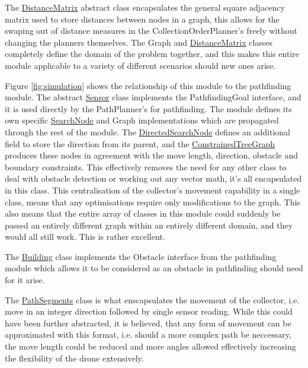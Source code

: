 \documentclass[10pt,a4paper]{article}
\begin{document}
The \hyperref[tab:DistanceMatrix]{\color{blue}DistanceMatrix} abstract class encapsulates the general square adjacency matrix used to store distances between nodes in a graph, this allows for the swaping out of distance measures in the CollectionOrderPlanner's freely without changing the planners themselves.
The Graph and \hyperref[tab:DistanceMatrix]{\color{blue}DistanceMatrix} classes completely define the domain of the problem together, and this makes this entire module applicable to a variety of different scenarios should new ones arise.

Figure \ref{fig:simulation} shows the relationship of this module to the pathfinding module. The abstract \hyperref[tab:Sensor]{\color{blue}Sensor} class implements the PathfindingGoal interface, and it is used directly by the PathPlanner's for pathfinding.
The module defines its own specific \hyperref[tab:SearchNode]{\color{blue}SearchNode} and Graph implementations which are propagated through the rest of the module.
The \hyperref[tab:DirectedSearchNode]{\color{blue}DirectedSearchNode} defines an additional field to store the direction from its parent, and the \hyperref[tab:ConstrainedTreeGraph]{\color{blue}ConstrainedTreeGraph} produces these nodes in agreement with the move length, direction, obstacle and boundary constraints. This effectively removes the need for any other class 
to deal with obstacle detection or working out any vector math, it's all encapsulated in this class. This centralisation of the collector's movement capability in a single class, means that 
any optimisations require only modifications to the graph. This also means that the entire array of classes in this module could suddenly be passed an entirely different graph within an entirely different domain,
and they would all still work. This is rather excellent.

The \hyperref[tab:Building]{\color{blue}Building} class implements the Obstacle interface from the pathfinding module which allows it to be considered as an obstacle in pathfinding should need for it arise.

The \hyperref[tab:PathSegment]{\color{blue}PathSegments} class is what enscapsulates the movement of the collector, i.e. move in an integer direction followed by single sensor reading.
While this could have been further abstracted, it is believed, that any form of movement can be approximated with this format, i.e. should a more complex path be neccessary, the move length could be reduced and more angles allowed effectively increasing the flexibility of the drone extensively.
\end{document}
